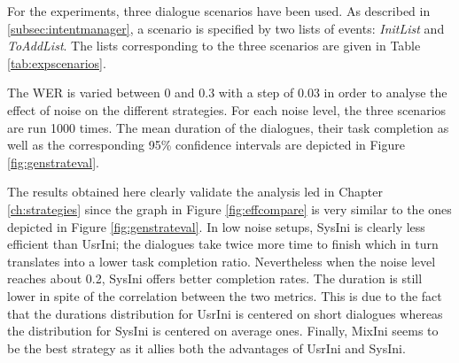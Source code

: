 \begin{figure*}[b!]
\begin{subfigure}[t]{.5\textwidth}
                  \end{subfigure}
                  \caption{Simulated mean duration (left) and dialogue task completion (right) for different noise levels}
                    \label{fig:genstrateval}
              \end{figure*}
              
  		For the experiments, three dialogue scenarios have been used. As described in \ref{subsec:intentmanager}, a scenario is specified by two lists of events: \textit{InitList} and \textit{ToAddList}. The lists corresponding to the three scenarios are given in Table \ref{tab:expscenarios}.
        
       	The WER is varied between 0 and 0.3 with a step of 0.03 in order to analyse the effect of noise on the different strategies. For each noise level, the three scenarios are run 1000 times. The mean duration of the dialogues, their task completion as well as the corresponding 95\% confidence intervals are depicted in Figure \ref{fig:genstrateval}.
        
        The results obtained here clearly validate the analysis led in Chapter \ref{ch:strategies} since the graph in Figure \ref{fig:effcompare} is very similar to the ones depicted in Figure \ref{fig:genstrateval}. In low noise setups, SysIni is clearly less efficient than UsrIni; the dialogues take twice more time to finish which in turn translates into a lower task completion ratio. Nevertheless when the noise level reaches about 0.2, SysIni offers better completion rates. The duration is still lower in spite of the correlation between the two metrics. This is due to the fact that the durations distribution for UsrIni is centered on short dialogues whereas the distribution for SysIni is centered on average ones. Finally, MixIni seems to be the best strategy as it allies both the advantages of UsrIni and SysIni.
        
        
